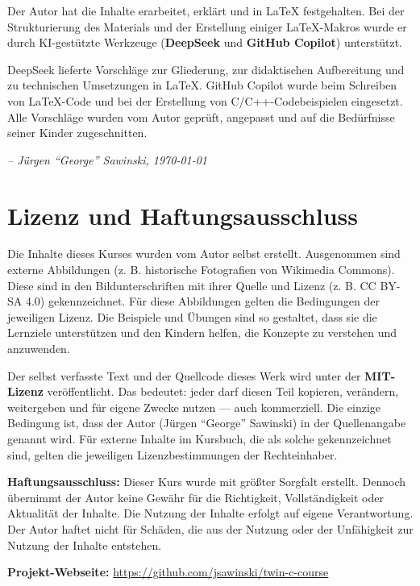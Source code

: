 Der Autor hat die Inhalte erarbeitet, erklärt und in LaTeX festgehalten. Bei der Strukturierung des Materials und der Erstellung einiger LaTeX-Makros
wurde er durch KI-gestützte Werkzeuge (\textbf{DeepSeek} und \textbf{GitHub Copilot}) unterstützt.

DeepSeek lieferte Vorschläge zur Gliederung, zur didaktischen Aufbereitung und zu technischen Umsetzungen in LaTeX. GitHub Copilot wurde beim Schreiben von 
LaTeX-Code und bei der Erstellung von C/C++-Codebeispielen eingesetzt. Alle Vorschläge wurden vom Autor geprüft, angepasst und auf die Bedürfnisse seiner Kinder zugeschnitten.

\textit{-- Jürgen ``George'' Sawinski, \today}

\section*{Lizenz und Haftungsausschluss}

Die Inhalte dieses Kurses wurden vom Autor selbst erstellt. Ausgenommen sind externe Abbildungen (z. B. historische Fotografien von Wikimedia Commons). Diese sind in den Bildunterschriften mit ihrer Quelle und Lizenz (z. B. CC BY-SA 4.0) gekennzeichnet. Für diese Abbildungen gelten die Bedingungen der jeweiligen Lizenz. Die Beispiele und Übungen sind so gestaltet, dass sie die Lernziele unterstützen und den Kindern helfen, die Konzepte zu verstehen und anzuwenden.

Der selbst verfasste Text und der Quellcode dieses Werk wird unter der \textbf{MIT-Lizenz} veröffentlicht. Das bedeutet: jeder darf diesen Teil kopieren, verändern, weitergeben und für eigene Zwecke nutzen — auch kommerziell. Die einzige Bedingung ist, dass der Autor (Jürgen ``George'' Sawinski) in der Quellenangabe genannt wird. Für externe Inhalte im Kursbuch, die als solche gekennzeichnet sind, gelten die jeweiligen Lizenzbestimmungen der Rechteinhaber.

\textbf{Haftungsausschluss:} 
Dieser Kurs wurde mit größter Sorgfalt erstellt. Dennoch übernimmt der Autor 
keine Gewähr für die Richtigkeit, Vollständigkeit oder Aktualität der Inhalte. 
Die Nutzung der Inhalte erfolgt auf eigene Verantwortung. Der Autor haftet nicht 
für Schäden, die aus der Nutzung oder der Unfähigkeit zur Nutzung der Inhalte 
entstehen.

\vspace{1.0cm}
\noindent
\textbf{Projekt-Webseite:} \url{https://github.com/jsawinski/twin-c-course}

